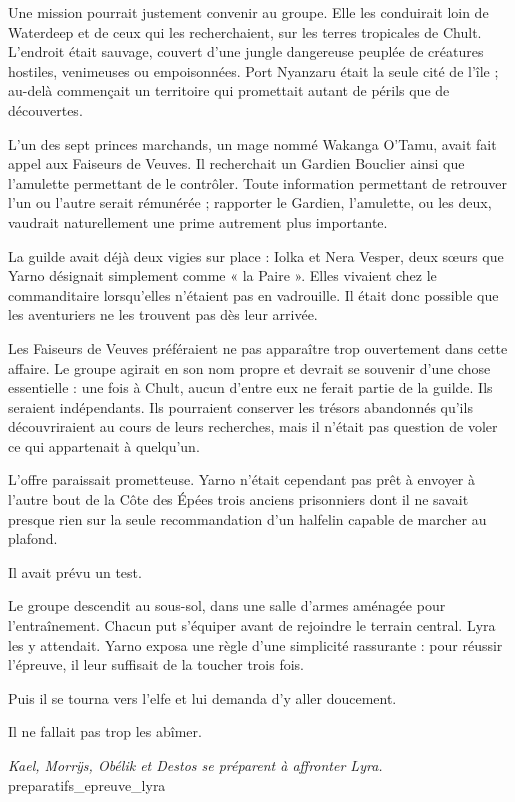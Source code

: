 Une mission pourrait justement convenir au groupe. Elle les conduirait loin de Waterdeep et de ceux qui les recherchaient, sur les terres tropicales de Chult. L'endroit était sauvage, couvert d'une jungle dangereuse peuplée de créatures hostiles, venimeuses ou empoisonnées. Port Nyanzaru était la seule cité de l'île ; au-delà commençait un territoire qui promettait autant de périls que de découvertes.

L'un des sept princes marchands, un mage nommé Wakanga O'Tamu, avait fait appel aux Faiseurs de Veuves. Il recherchait un Gardien Bouclier ainsi que l'amulette permettant de le contrôler. Toute information permettant de retrouver l'un ou l'autre serait rémunérée ; rapporter le Gardien, l'amulette, ou les deux, vaudrait naturellement une prime autrement plus importante.

La guilde avait déjà deux vigies sur place : Iolka et Nera Vesper, deux sœurs que Yarno désignait simplement comme « la Paire ». Elles vivaient chez le commanditaire lorsqu'elles n'étaient pas en vadrouille. Il était donc possible que les aventuriers ne les trouvent pas dès leur arrivée.

Les Faiseurs de Veuves préféraient ne pas apparaître trop ouvertement dans cette affaire. Le groupe agirait en son nom propre et devrait se souvenir d'une chose essentielle : une fois à Chult, aucun d'entre eux ne ferait partie de la guilde. Ils seraient indépendants. Ils pourraient conserver les trésors abandonnés qu'ils découvriraient au cours de leurs recherches, mais il n'était pas question de voler ce qui appartenait à quelqu'un.

L'offre paraissait prometteuse. Yarno n'était cependant pas prêt à envoyer à l'autre bout de la Côte des Épées trois anciens prisonniers dont il ne savait presque rien sur la seule recommandation d'un halfelin capable de marcher au plafond.

Il avait prévu un test.

\scenebreak

Le groupe descendit au sous-sol, dans une salle d'armes aménagée pour l'entraînement. Chacun put s'équiper avant de rejoindre le terrain central. Lyra les y attendait. Yarno exposa une règle d'une simplicité rassurante : pour réussir l'épreuve, il leur suffisait de la toucher trois fois.

Puis il se tourna vers l'elfe et lui demanda d'y aller doucement.

Il ne fallait pas trop les abîmer.

{\textit{Kael, Morrÿs, Obélik et Destos se préparent à affronter Lyra.}}
{preparatifs_epreuve_lyra}

